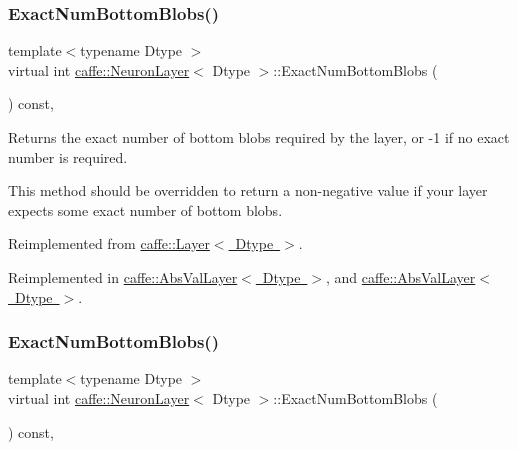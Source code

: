 \subsubsection{\texorpdfstring{Exact\+Num\+Bottom\+Blobs()}{ExactNumBottomBlobs()}\hspace{0.1cm}{\footnotesize\ttfamily [1/2]}}
{\footnotesize\ttfamily template$<$typename Dtype $>$ \\
virtual int \mbox{\hyperlink{classcaffe_1_1_neuron_layer}{caffe\+::\+Neuron\+Layer}}$<$ Dtype $>$\+::Exact\+Num\+Bottom\+Blobs (\begin{DoxyParamCaption}{ }\end{DoxyParamCaption}) const\hspace{0.3cm}{\ttfamily [inline]}, {\ttfamily [virtual]}}



Returns the exact number of bottom blobs required by the layer, or -\/1 if no exact number is required. 

This method should be overridden to return a non-\/negative value if your layer expects some exact number of bottom blobs. 

Reimplemented from \mbox{\hyperlink{classcaffe_1_1_layer_a8e5ee0494d85f5f55fc4396537cbc60f}{caffe\+::\+Layer$<$ Dtype $>$}}.



Reimplemented in \mbox{\hyperlink{classcaffe_1_1_abs_val_layer_acac806dbc6d3fa3dd7daae00caabd731}{caffe\+::\+Abs\+Val\+Layer$<$ Dtype $>$}}, and \mbox{\hyperlink{classcaffe_1_1_abs_val_layer_acac806dbc6d3fa3dd7daae00caabd731}{caffe\+::\+Abs\+Val\+Layer$<$ Dtype $>$}}.

\mbox{\label{classcaffe_1_1_neuron_layer_abb6c0e6acd2863baf47d6e6acda6f55f}} 
\subsubsection{\texorpdfstring{Exact\+Num\+Bottom\+Blobs()}{ExactNumBottomBlobs()}\hspace{0.1cm}{\footnotesize\ttfamily [2/2]}}
{\footnotesize\ttfamily template$<$typename Dtype $>$ \\
virtual int \mbox{\hyperlink{classcaffe_1_1_neuron_layer}{caffe\+::\+Neuron\+Layer}}$<$ Dtype $>$\+::Exact\+Num\+Bottom\+Blobs (\begin{DoxyParamCaption}{ }\end{DoxyParamCaption}) const\hspace{0.3cm}{\ttfamily [inline]}, {\ttfamily [virtual]}}



